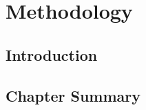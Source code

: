 \chapter{Methodology}
\label{ch:methodology}

\section{Introduction}

















\section{Chapter Summary}




